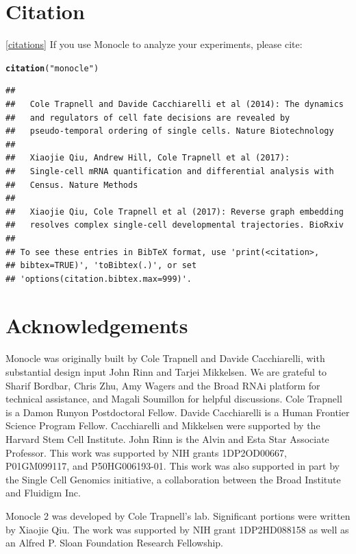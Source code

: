 \documentclass[10pt,oneside]{article}\usepackage[]{graphicx}\usepackage[]{color}
\makeatletter
\newcommand{\hlstr}[1]{\textcolor[rgb]{0.192,0.494,0.8}{#1}}%
\newcommand{\hlstd}[1]{\textcolor[rgb]{0.345,0.345,0.345}{#1}}%
\newcommand{\hlkwd}[1]{\textcolor[rgb]{0.737,0.353,0.396}{\textbf{#1}}}%
\newenvironment{kframe}{%
 \def\at@end@of@kframe{}%
 \ifinner\ifhmode%
  \def\at@end@of@kframe{\end{minipage}}%
  \begin{minipage}{\columnwidth}%
 \fi\fi%
 \def\FrameCommand##1{\hskip\@totalleftmargin \hskip-\fboxsep
 \colorbox{shadecolor}{##1}\hskip-\fboxsep
     \hskip-\linewidth \hskip-\@totalleftmargin \hskip\columnwidth}%
 \MakeFramed {\advance\hsize-\width
   \@totalleftmargin\z@ \linewidth\hsize
   \@setminipage}}%
 {\par\unskip\endMakeFramed%
 \at@end@of@kframe}
\newenvironment{knitrout}{}{} %
\makeatother
\begin{document}
 \section{Citation}\ref{citations}
 If you use Monocle to analyze your experiments, please cite:
\begin{knitrout}
\color{fgcolor}\begin{kframe}
\begin{alltt}
\hlkwd{citation}\hlstd{(}\hlstr{"monocle"}\hlstd{)}
\end{alltt}
\begin{verbatim}
## 
##   Cole Trapnell and Davide Cacchiarelli et al (2014): The dynamics
##   and regulators of cell fate decisions are revealed by
##   pseudo-temporal ordering of single cells. Nature Biotechnology
## 
##   Xiaojie Qiu, Andrew Hill, Cole Trapnell et al (2017):
##   Single-cell mRNA quantification and differential analysis with
##   Census. Nature Methods
## 
##   Xiaojie Qiu, Cole Trapnell et al (2017): Reverse graph embedding
##   resolves complex single-cell developmental trajectories. BioRxiv
## 
## To see these entries in BibTeX format, use 'print(<citation>,
## bibtex=TRUE)', 'toBibtex(.)', or set
## 'options(citation.bibtex.max=999)'.
\end{verbatim}
\end{kframe}
\end{knitrout}
 
 \section{Acknowledgements}
 
 Monocle was originally built by Cole Trapnell and Davide Cacchiarelli, with substantial design input John Rinn and Tarjei Mikkelsen. We are grateful to Sharif Bordbar, Chris Zhu, Amy Wagers and the Broad RNAi platform for technical assistance, and Magali Soumillon for helpful discussions. Cole Trapnell is a Damon Runyon Postdoctoral Fellow. Davide Cacchiarelli is a Human Frontier Science Program Fellow. Cacchiarelli and Mikkelsen were supported by the Harvard Stem Cell Institute. John Rinn is the Alvin and Esta Star Associate Professor. This work was supported by NIH grants 1DP2OD00667, P01GM099117, and P50HG006193-01. This work was also supported in part by the Single Cell Genomics initiative, a collaboration between the Broad Institute and Fluidigm Inc.
 
 Monocle 2 was developed by Cole Trapnell's lab. Significant portions were written by Xiaojie Qiu. The work was supported by NIH grant 1DP2HD088158 as well as an Alfred P. Sloan Foundation Research Fellowship.
 
\end{document}
